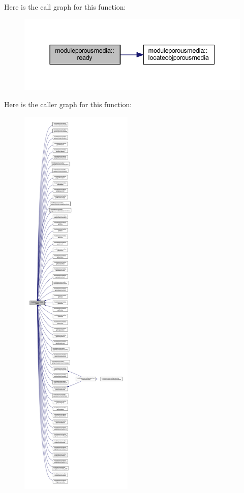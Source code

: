 Here is the call graph for this function\+:\nopagebreak
\begin{figure}[H]
\begin{center}
\leavevmode
\includegraphics[width=337pt]{namespacemoduleporousmedia_a9773f71db5ddd0e9b7ddeac94fc33e39_cgraph}
\end{center}
\end{figure}
Here is the caller graph for this function\+:\nopagebreak
\begin{figure}[H]
\begin{center}
\leavevmode
\includegraphics[height=550pt]{namespacemoduleporousmedia_a9773f71db5ddd0e9b7ddeac94fc33e39_icgraph}
\end{center}
\end{figure}
\mbox{\label{namespacemoduleporousmedia_ac37dcb693dc313ce78306c5294823662}} 
